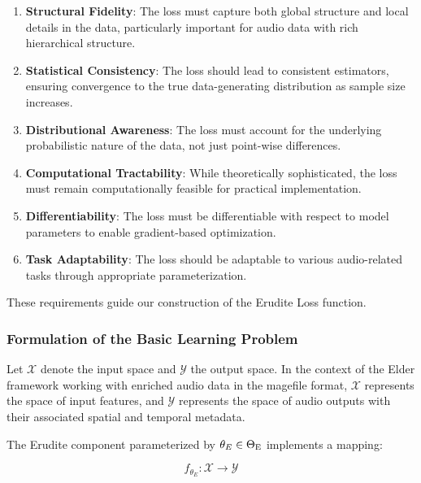 \begin{enumerate}
\item \textbf{Structural Fidelity}: The loss must capture both global structure and local details in the data, particularly important for audio data with rich hierarchical structure.

\item \textbf{Statistical Consistency}: The loss should lead to consistent estimators, ensuring convergence to the true data-generating distribution as sample size increases.

\item \textbf{Distributional Awareness}: The loss must account for the underlying probabilistic nature of the data, not just point-wise differences.

\item \textbf{Computational Tractability}: While theoretically sophisticated, the loss must remain computationally feasible for practical implementation.

\item \textbf{Differentiability}: The loss must be differentiable with respect to model parameters to enable gradient-based optimization.

\item \textbf{Task Adaptability}: The loss should be adaptable to various audio-related tasks through appropriate parameterization.
\end{enumerate}

These requirements guide our construction of the Erudite Loss function.

\subsubsection{Formulation of the Basic Learning Problem}

Let $\mathcal{X}$ denote the input space and $\mathcal{Y}$ the output space. In the context of the Elder framework working with enriched audio data in the magefile format, $\mathcal{X}$ represents the space of input features, and $\mathcal{Y}$ represents the space of audio outputs with their associated spatial and temporal metadata.

The Erudite component parameterized by $\theta_E \in \Theta_{\text{E}}$ implements a mapping:

\begin{equation}
f_{\theta_E}: \mathcal{X} \rightarrow \mathcal{Y}
\end{equation}

